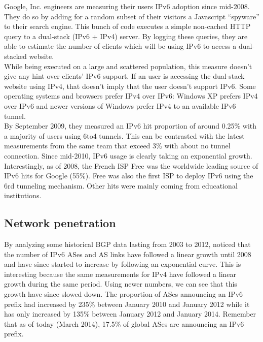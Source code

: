 \documentclass[journal]{IEEEtran}
\begin{document}
Google, Inc. engineers are measuring their users IPv6 adoption since
mid-2008. \\
They do so by adding for a random subset of their visitors a Javascript
\enquote{spyware} to their search engine.
This bunch of code executes a simple non-cached HTTP query to a dual-stack
(IPv6 + IPv4) server. By logging these queries, they are able to
estimate the number of clients which will be using IPv6 to access a dual-stacked
website\cite{paper2}. \\
While being executed on a large and scattered population, this measure doesn't
give any hint over clients' IPv6 support. If an user is accessing the dual-stack
website using IPv4, that doesn't imply that the user doesn't support IPv6. Some
operating systems and browsers prefer IPv4 over IPv6: Windows XP prefers IPv4
over IPv6 and newer versions of Windows prefer IPv4 to an available IPv6
tunnel. \\
By September 2009, they measured an IPv6 hit proportion of around 0.25\% with a
majority of users using 6to4 tunnels. This can be contrasted with the latest
measurements from the same team that exceed 3\% with about no tunnel
connection. Since mid-2010, IPv6 usage is clearly taking an exponential 
growth\cite{google:ipv6}. \\
Interestingly, as of 2008, the French ISP Free was the worldwide leading source
of IPv6 hits for Google (55\%). Free was also the first ISP to deploy IPv6 using
the 6rd tunneling mechanism\cite{free:6rd}. Other hits were mainly coming from
educational institutions.

\subsection{Network penetration}
\label{network_penetration}

By analyzing some historical BGP data lasting from 2003 to 2012, \cite{paper4}
noticed that the number of IPv6 ASes and AS links have followed a linear
growth until 2008 and have since started to increase by following an exponential
curve. This is interesting because the same measurements for IPv4 have followed
a linear growth during the same period. Using newer
numbers\cite{ripe:ipv6stats}, we can see that this growth have since
slowed down. The proportion of ASes announcing an IPv6 prefix had increased by
235\% between January 2010 and January 2012 while it has only increased by 135\%
between January 2012 and January 2014. Remember that as of today (March 2014),
17.5\% of global ASes are announcing an IPv6 prefix.\\
\end{document}
